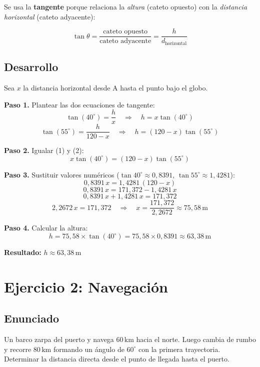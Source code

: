 \documentclass[11pt, letterpaper]{article}
\begin{document}
Se usa la \textbf{tangente} porque relaciona la \emph{altura} (cateto opuesto) con la
\emph{distancia horizontal} (cateto adyacente):

\begin{formulabox}
\[
  \tan\theta = \frac{\text{cateto opuesto}}{\text{cateto adyacente}}
              = \frac{h}{d_{\text{horizontal}}}
\]
\end{formulabox}

\subsection*{Desarrollo}

Sea \(x\) la distancia horizontal desde A hasta el punto bajo el globo.

\textbf{Paso 1.} Plantear las dos ecuaciones de tangente:
\[
  \tan(40^\circ) = \frac{h}{x}
  \quad\Longrightarrow\quad
  h = x\tan(40^\circ) \tag{1}
\]
\[
  \tan(55^\circ) = \frac{h}{120 - x}
  \quad\Longrightarrow\quad
  h = (120 - x)\tan(55^\circ) \tag{2}
\]

\textbf{Paso 2.} Igualar (1) y (2):
\[
  x\tan(40^\circ) = (120 - x)\tan(55^\circ)
\]

\textbf{Paso 3.} Sustituir valores numéricos
(\(\tan 40^\circ \approx 0{,}8391\), \(\tan 55^\circ \approx 1{,}4281\)):
\[
  0{,}8391\,x = 1{,}4281\,(120 - x)
\]
\[
  0{,}8391\,x = 171{,}372 - 1{,}4281\,x
\]
\[
  0{,}8391\,x + 1{,}4281\,x = 171{,}372
\]
\[
  2{,}2672\,x = 171{,}372
  \quad\Longrightarrow\quad
  x = \frac{171{,}372}{2{,}2672} \approx 75{,}58\,\text{m}
\]

\textbf{Paso 4.} Calcular la altura:
\[
  h = 75{,}58 \times \tan(40^\circ) = 75{,}58 \times 0{,}8391 \approx 63{,}38\,\text{m}
\]

\begin{resultbox}
\textbf{Resultado:} \quad \(h \approx 63{,}38\,\text{m}\)
\end{resultbox}

\newpage
\section{Ejercicio 2: Navegación}

\subsection*{Enunciado}
Un barco zarpa del puerto y navega \(60\,\text{km}\) hacia el norte. Luego cambia de
rumbo y recorre \(80\,\text{km}\) formando un ángulo de \(60^\circ\) con la primera
trayectoria. Determinar la distancia directa desde el punto de llegada hasta el puerto.
\end{document}
